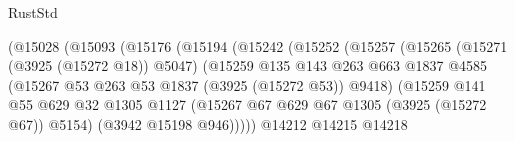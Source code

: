 \begin{lexlean}{RustStd}
\begin{coremodule}
                                        (@15028
                                          (@15093
                                            (@15176
                                              (@15194
                                                (@15242
                                                  (@15252
                                                    (@15257
                                                      (@15265
                                                        (@15271 (@3925 (@15272 @18)) @5047)
                                                        (@15259
                                                          @135
                                                          @143
                                                          @263
                                                          @663
                                                          @1837
                                                          @4585
                                                          (@15267
                                                            @53
                                                            @263
                                                            @53
                                                            @1837
                                                            (@3925 (@15272 @53))
                                                            @9418)
                                                          (@15259
                                                            @141
                                                            @55
                                                            @629
                                                            @32
                                                            @1305
                                                            @1127
                                                            (@15267
                                                              @67
                                                              @629
                                                              @67
                                                              @1305
                                                              (@3925 (@15272 @67))
                                                              @5154)
                                                            (@3942 @15198 @946)))))
                                                    @14212
                                                    @14215
                                                    @14218

\end{coremodule}
\end{lexlean}
